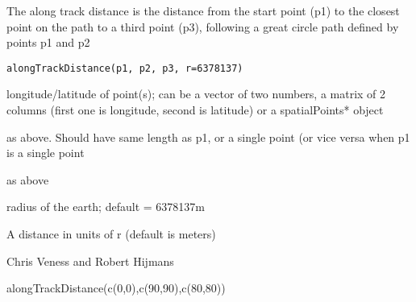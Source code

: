\begin{Description}\relax
The along track distance is the distance from the start point (p1) to the closest point on the path to a third point (p3), 
following a great circle path defined by points p1 and p2
\end{Description}
\begin{Usage}
\begin{verbatim}
alongTrackDistance(p1, p2, p3, r=6378137)
\end{verbatim}
\end{Usage}
\begin{Arguments}
\begin{ldescription}
\item[\code{p1}] longitude/latitude of point(s); can be a vector of two numbers, a matrix of 2 columns (first one is longitude, second is latitude) or a spatialPoints* object
\item[\code{p2}] as above. Should have same length as p1, or a single point (or vice versa when p1 is a single point
\item[\code{p3}] as above
\item[\code{r}] radius of the earth; default = 6378137m
\end{ldescription}
\end{Arguments}
\begin{Value}
A distance in units of r (default is meters)
\end{Value}
\begin{Author}\relax
Chris Veness and Robert Hijmans
\end{Author}
\begin{SeeAlso}\relax
{}
\end{SeeAlso}
\begin{Examples}
\begin{ExampleCode}
alongTrackDistance(c(0,0),c(90,90),c(80,80))
\end{ExampleCode}
\end{Examples}

